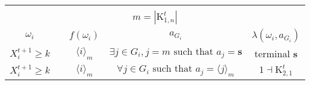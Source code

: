 \documentclass[12pt,letter]{article}
\newcommand{\Kappa}{\mathrm{K}}
\theoremstyle{definition}
\theoremstyle{remark}
\theoremstyle{claim}
\begin{document}
\begin{table}[!htbp]
\begin{center}
\begin{tabular}{c c | c | c | c}
\hline
\\
\multicolumn{5}{c}{$m= |\Kappa^t_{1,n}|$}\\
$\omega_i$ 	 & 	   &	$f(\omega_i)$  &	$a_{G_i}$ & $\lambda(\omega_i,a_{G_i})$ \\
\hline
\hline
$X^{t+1}_i\geq k$ 	& 						& $\langle i \rangle_m$		&  $\exists j\in G_i, j=m\text{ such that } a_j=\textbf{s}$	& terminal \textbf{s}\\
$X^{t+1}_i\geq k$ 	& 						& $\langle i \rangle_m$		&  $\forall j\in G_i\text{ such that } a_j= \langle j \rangle_m$	& $1\dashv \Kappa^t_{2,1}$\\
\hline
\end{tabular}
\end{center}
\end{table}


\clearpage
\end{document}
